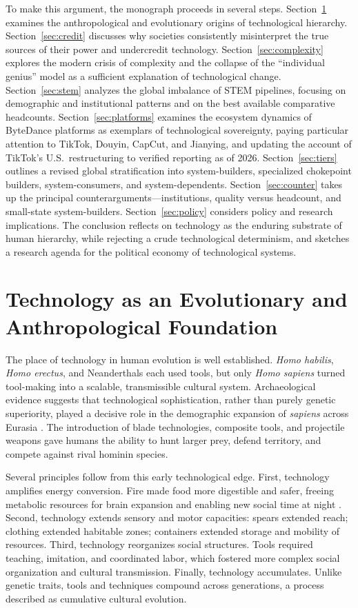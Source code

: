 \documentclass[12pt,letterpaper]{article}
\begin{document}
To make this argument, the monograph proceeds in several steps. Section~\ref{sec:anthro} examines the anthropological and evolutionary origins of technological hierarchy. Section~\ref{sec:credit} discusses why societies consistently misinterpret the true sources of their power and undercredit technology. Section~\ref{sec:complexity} explores the modern crisis of complexity and the collapse of the ``individual genius'' model as a sufficient explanation of technological change. Section~\ref{sec:stem} analyzes the global imbalance of STEM pipelines, focusing on demographic and institutional patterns and on the best available comparative headcounts. Section~\ref{sec:platforms} examines the ecosystem dynamics of ByteDance platforms as exemplars of technological sovereignty, paying particular attention to TikTok, Douyin, CapCut, and Jianying, and updating the account of TikTok's U.S.\ restructuring to verified reporting as of 2026. Section~\ref{sec:tiers} outlines a revised global stratification into system-builders, specialized chokepoint builders, system-consumers, and system-dependents. Section~\ref{sec:counter} takes up the principal counterarguments---institutions, quality versus headcount, and small-state system-builders. Section~\ref{sec:policy} considers policy and research implications. The conclusion reflects on technology as the enduring substrate of human hierarchy, while rejecting a crude technological determinism, and sketches a research agenda for the political economy of technological systems.

\section{Technology as an Evolutionary and Anthropological Foundation}
\label{sec:anthro}

The place of technology in human evolution is well established. \textit{Homo habilis}, \textit{Homo erectus}, and Neanderthals each used tools, but only \textit{Homo sapiens} turned tool-making into a scalable, transmissible cultural system. Archaeological evidence suggests that technological sophistication, rather than purely genetic superiority, played a decisive role in the demographic expansion of \textit{sapiens} across Eurasia \cite{mithen1996,gamble2013}. The introduction of blade technologies, composite tools, and projectile weapons gave humans the ability to hunt larger prey, defend territory, and compete against rival hominin species.

Several principles follow from this early technological edge. First, technology amplifies energy conversion. Fire made food more digestible and safer, freeing metabolic resources for brain expansion and enabling new social time at night \cite{wrangham2009}. Second, technology extends sensory and motor capacities: spears extended reach; clothing extended habitable zones; containers extended storage and mobility of resources. Third, technology reorganizes social structures. Tools required teaching, imitation, and coordinated labor, which fostered more complex social organization and cultural transmission. Finally, technology accumulates. Unlike genetic traits, tools and techniques compound across generations, a process described as cumulative cultural evolution.
\end{document}
